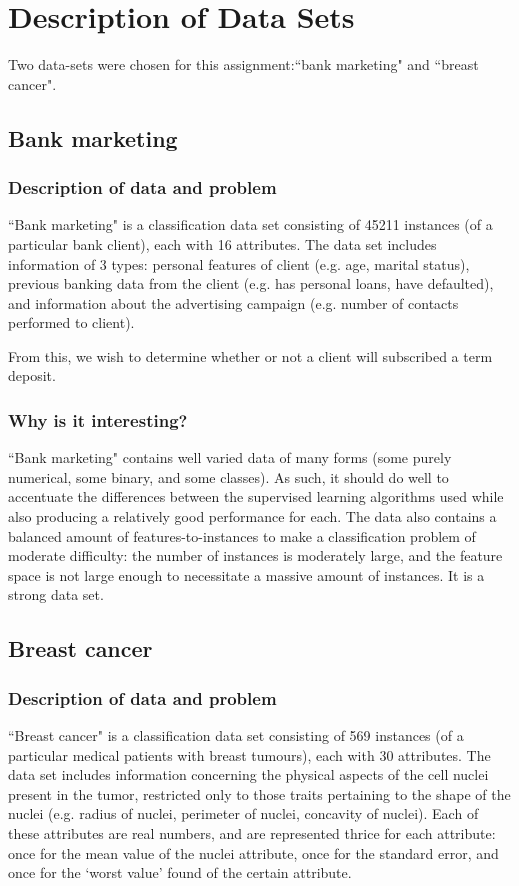 \section{Description of Data Sets}

Two data-sets were chosen for this assignment:``bank marketing" and ``breast cancer".

\subsection{Bank marketing}

\subsubsection{Description of data and problem}
``Bank marketing" is a classification data set consisting of 45211 instances (of a particular bank client), each with 16 attributes. The data set includes information of 3 types: personal features of client (e.g. age, marital status), previous banking data from the client (e.g. has personal loans, have defaulted), and information about the advertising campaign (e.g. number of contacts performed to client).

From this, we wish to determine whether or not a client will subscribed a term deposit.

\subsubsection{Why is it interesting?}
``Bank marketing" contains well varied data of many forms (some purely numerical, some binary, and some classes). As such, it should do well to accentuate the differences between the supervised learning algorithms used while also producing a relatively good performance for each. The data also contains a balanced amount of features-to-instances to make a classification problem of moderate difficulty: the number of instances is moderately large, and the feature space is not large enough to necessitate a massive amount of instances. It is a strong data set.

\subsection{Breast cancer}

\subsubsection{Description of data and problem}
``Breast cancer" is a classification data set consisting of 569 instances (of a particular medical patients with breast tumours), each with 30 attributes. The data set includes information concerning the physical aspects of the cell nuclei present in the tumor, restricted only to those traits pertaining to the shape of the nuclei (e.g. radius of nuclei, perimeter of nuclei, concavity of nuclei). Each of these attributes are real numbers, and are represented thrice for each attribute: once for the mean value of the nuclei attribute, once for the standard error, and once for the `worst value' found of the certain attribute.

